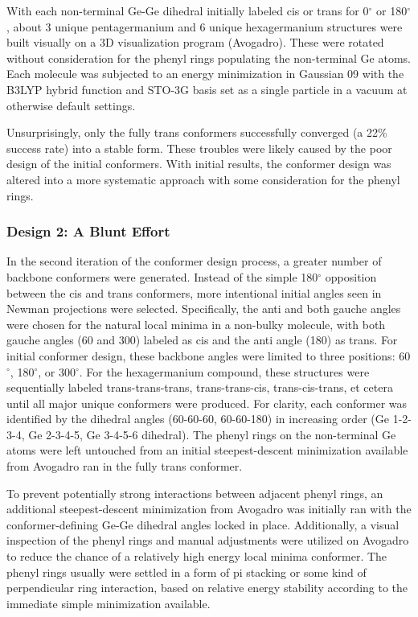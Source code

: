 With each non-terminal Ge-Ge dihedral initially labeled cis or trans for 0$^{\circ}$ or 180$^{\circ}$, about 3 unique pentagermanium and 6 unique hexagermanium structures were built visually on a 3D visualization program (Avogadro).
These were rotated without consideration for the phenyl rings populating the non-terminal Ge atoms.
Each molecule was subjected to an energy minimization in Gaussian 09 with the B3LYP hybrid function and STO-3G basis set as a single particle in a vacuum at otherwise default settings. 

Unsurprisingly, only the fully trans conformers successfully converged (a 22\% success rate) into a stable form. 
These troubles were likely caused by the poor design of the initial conformers. 
With initial results, the conformer design was altered into a more systematic approach with some consideration for the phenyl rings.

\subsubsection{Design 2: A Blunt Effort}

In the second iteration of the conformer design process, a greater number of backbone conformers were generated. 
Instead of the simple 180$^{\circ}$ opposition between the cis and trans conformers, more intentional initial angles seen in Newman projections were selected.
Specifically, the anti and both gauche angles were chosen for the natural local minima in a non-bulky molecule, with both gauche angles (60 and 300) labeled as cis and the anti angle (180) as trans. 
For initial conformer design, these backbone angles were limited to three positions: 60$^{\circ}$, 180$^{\circ}$, or 300$^{\circ}$.
For the hexagermanium compound, these structures were sequentially labeled trans-trans-trans, trans-trans-cis, trans-cis-trans, et cetera until all major unique conformers were produced.
For clarity, each conformer was identified by the dihedral angles (60-60-60, 60-60-180) in increasing order (Ge 1-2-3-4, Ge 2-3-4-5, Ge 3-4-5-6 dihedral).
The phenyl rings on the non-terminal Ge atoms were left untouched from an initial steepest-descent minimization available from Avogadro ran in the fully trans conformer.

To prevent potentially strong interactions between adjacent phenyl rings, an additional steepest-descent minimization from Avogadro was initially ran with the conformer-defining Ge-Ge dihedral angles locked in place. 
Additionally, a visual inspection of the phenyl rings and manual adjustments were utilized on Avogadro to reduce the chance of a relatively high energy local minima conformer. 
The phenyl rings usually were settled in a form of pi stacking or some kind of perpendicular ring interaction, based on relative energy stability according to the immediate simple minimization available. 

